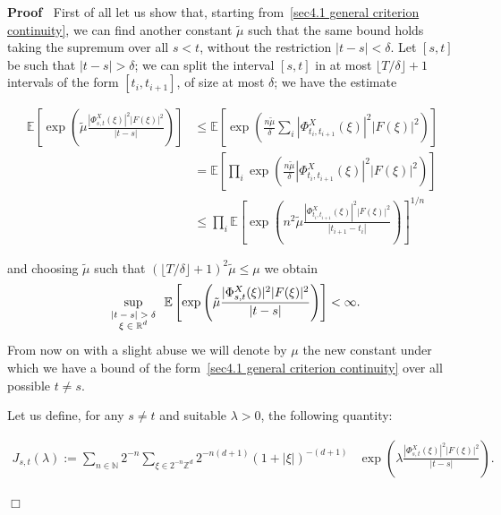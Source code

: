 \documentclass[10pt]{article}
\newcommand{\assign}{:=}
\newcommand{\tmscript}[1]{\text{\scriptsize{$#1$}}}
\newenvironment{proof}{\noindent\textbf{Proof\ }}{\hspace*{\fill}$\Box$\medskip}
\begin{document}
\begin{proof}
  First of all let us show that, starting from~{\eqref{sec4.1 general
  criterion continuity}}, we can find another constant $\tilde{\mu}$ such that
  the same bound holds taking the supremum over all $s < t$, without the
  restriction $| t - s | < \delta$. Let $[s, t]$ be such that $| t - s | >
  \delta$; we can split the interval $[s, t]$ in at most $\lfloor T / \delta
  \rfloor + 1$ intervals of the form $[t_i, t_{i + 1}]$, of size at most
  $\delta$; we have the estimate
  
  \begin{align*}
    \mathbb{E} \left[ \exp \left( \tilde{\mu}  \frac{| \Phi^X_{s, t} (\xi) |^2
    | F (\xi) |^2}{| t - s |} \right) \right] & \leqslant \mathbb{E} \left[
    \exp \left( \frac{n \tilde{\mu}}{\delta}  \sum_i | \Phi^X_{t_i, t_{i + 1}}
    (\xi) |^2 | F (\xi) |^2 \right) \right]\\
    & =\mathbb{E} \left[ \prod_i \exp \left( \frac{n \tilde{\mu}}{\delta} |
    \Phi^X_{t_i, t_{i + 1}} (\xi) |^2 | F (\xi) |^2 \right) \right]\\
    & \leqslant \prod_i \mathbb{E} \left[ \exp \left( n^2 \tilde{\mu} 
    \frac{| \Phi^X_{t_i, t_{i + 1}} (\xi) |^2 | F (\xi) |^2}{| t_{i + 1} - t_i
    |} \right) \right]^{1 / n}
  \end{align*}
  
  and choosing $\tilde{\mu}$ such that $ (\lfloor T / \delta \rfloor + 1)^2
  \tilde{\mu} \leqslant \mu$ we obtain
  \[ \sup_{\tmscript{\begin{array}{c}
       | t - s | > \delta\\
       \xi \in \mathbb{R}^d
     \end{array}}} \mathbb{E} \left[ \exp \left( \tilde{\mu}  \frac{|
     \Phi^X_{s, t} (\xi) |^2  | F (\xi) |^2}{| t - s |} \right) \right] <
     \infty . \]
  From now on with a slight abuse we will denote by $\mu$ the new constant
  under which we have a bound of the form~{\eqref{sec4.1 general criterion
  continuity}} over all possible $t \neq s$.
  
  Let us define, for any $s \neq t$ and suitable $\lambda > 0$, the following
  quantity:
  
  \begin{align}
    J_{s, t} (\lambda) \assign \sum_{n \in \mathbb{N}} 2^{- n} \sum_{\xi \in
    2^{- n} \mathbb{Z}^d} 2^{- n (d + 1)} (1 + | \xi |)^{- (d + 1)} & \exp
    \left( \lambda \frac{| \Phi^X_{s, t} (\xi) |^2 | F (\xi) |^2}{| t - s |}
    \right) .
  \end{align}
  

\end{proof}
\end{document}
